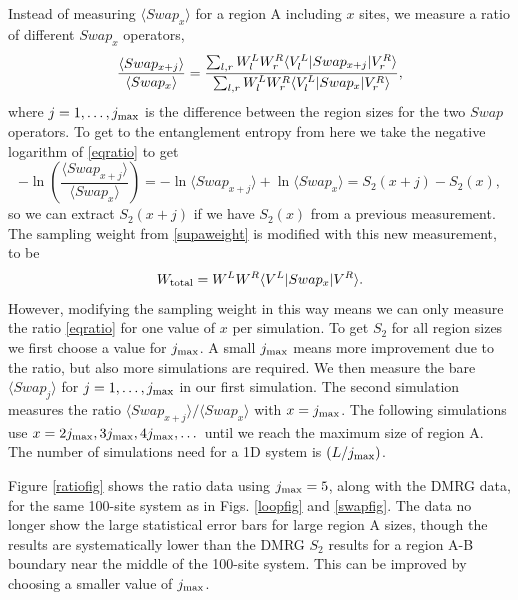 Instead of measuring  $\langle Swap_x \rangle$ for a region A including $x$ sites, we measure a ratio of different $Swap_x$ operators,
\begin{equation}
\label{eqratio}
\frac{\langle Swap_{x+j}\rangle}{\langle Swap_{x}\rangle} = 
\frac{ \sum_{l,r} W^L_l W^R_r \langle {V^L_l} \rvert Swap_{x+j} \lvert {V^R_r} \rangle}
							{\sum_{l,r} W^L_l W_r^R \langle {V^L_l} \rvert Swap_x \lvert { V^R_r} \rangle},
\end{equation}
where $j=1,\dots,j_{\rm max}$ is the difference between the region sizes for the two $Swap$ operators.
To get to the entanglement entropy from here we take the negative logarithm of \eqref{eqratio} to get
\begin{equation}
\label{eqratio2}
-\ln\left( \frac{\langle Swap_{x+j}\rangle}{\langle Swap_{x}\rangle} \right) = 
-\ln \langle Swap_{x+j}\rangle + \ln\langle Swap_{x}\rangle   =   S_2(x+j) - S_2(x),
\end{equation}
so we can extract $S_2(x+j)$ if we have $S_2(x)$ from a previous measurement.
The sampling weight from \eqref{supaweight} is modified with this new measurement, to be
\begin{equation}
W_{\rm total} = W^LW^R\langle {V^L} \rvert Swap_x \lvert {V^R} \rangle.
\end{equation}
However, modifying the sampling weight in this way means we can only measure the ratio \eqref{eqratio} for one value of $x$ per simulation.
To get $S_2$ for all region sizes we first choose a value for $j_{\rm max}$.
A small $j_{\rm max}$ means more improvement due to the ratio, but also more simulations are required.
We then measure the bare $\langle Swap_{j}\rangle$ for $j=1,\dots,j_{\rm max}$ in our first simulation.
The second simulation measures the ratio $\langle Swap_{x+j}\rangle / \langle Swap_{x}\rangle$ with $x=j_{\rm max}$.  The following simulations use $x=2j_{\rm max}, 3j_{\rm max}, 4j_{\rm max}, \dots$ until we reach the maximum size of region A.
The number of simulations need for a 1D system is $(L/j_{\rm max})$.




Figure \ref{ratiofig} shows the ratio data using $j_{\rm max} = 5$, along with the DMRG data, for the same 100-site system as in Figs. \ref{loopfig} and \ref{swapfig}. 
The data no longer show the large statistical error bars for large region A sizes, though the results are systematically lower than the DMRG $S_2$ results for a region A-B boundary near the middle of the 100-site system.  
This can be improved by choosing a smaller value of $j_{\rm max}$.




